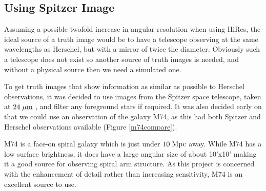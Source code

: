 \subsection{Using Spitzer Image}

Assuming a possible twofold increase in angular resolution when using HiRes, the ideal source of a truth image would be to have a telescope observing at the same wavelengths as Herschel, but with a mirror of twice the diameter. Obviously such a telescope does not exist so another source of truth images is needed, and without a physical source then we need a simulated one.

To get truth images that show information as similar as possible to Herschel observations, it was decided to use images from the Spitzer space telescope, taken at $24\;\mathrm{\mu m}$ \citep{werner2004spitzer}, and filter any foreground stars if required. It was also decided early on that we could use an observation of the galaxy M74, as this had both Spitzer and Herschel observations available (Figure \ref{m74compare}).

M74 is a face-on spiral galaxy which is just under $10\;\mathrm{Mpc}$ away. While M74 has a low surface brightness, it does have a large angular size of about 10'x10' making it a good source for observing spiral arm structure. As this project is concerned with the enhancement of detail rather than increasing sensitivity, M74 is an excellent source to use.

